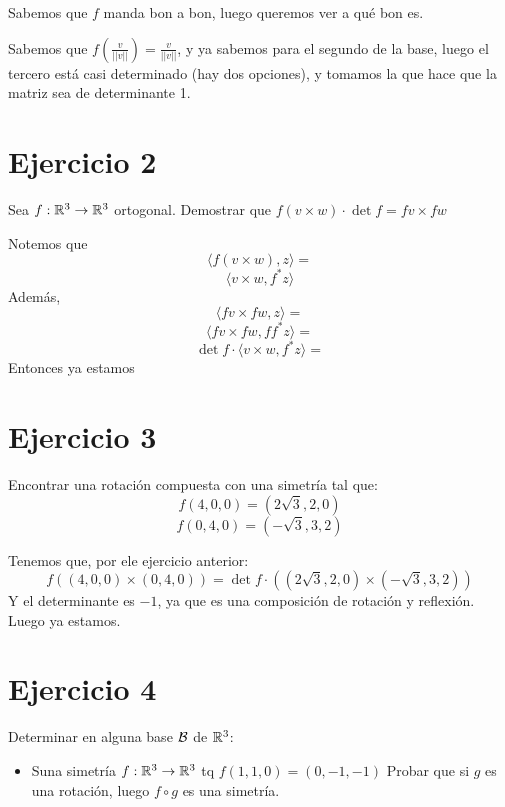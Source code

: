 \documentclass{article}
\begin{document}
Sabemos que $f$ manda bon a bon, luego queremos ver a qué bon es.

Sabemos que $f\left(\frac{v}{||v||}\right) = \frac{v}{||v||}$, y ya sabemos para el segundo de la base, luego el tercero está casi determinado (hay dos opciones), y tomamos la que hace que la matriz sea de determinante 1.

\section*{Ejercicio 2}
Sea $f : \mathbb{R}^3 \to \mathbb{R}^3$ ortogonal. Demostrar que $f(v \times w) \cdot \det f = fv \times fw$

Notemos que
\[
    \langle f(v \times w), z\rangle =
\]
\[
    \langle v \times w, f^*z\rangle
\]
Además,
\[
    \langle fv \times fw, z\rangle =
\]
\[
    \langle fv \times fw, ff^*z\rangle =
\]
\[
    \det f \cdot \langle v \times w, f^*z\rangle =
\]
Entonces ya estamos
\section*{Ejercicio 3}
Encontrar una rotación compuesta con una simetría tal que:
\[f(4,0,0) = (2\sqrt{3}, 2, 0)\]
\[f(0,4,0) = (-\sqrt{3}, 3, 2)\]

Tenemos que, por ele ejercicio anterior:
\[
    f((4,0,0) \times (0,4,0)) = \det f \cdot ((2\sqrt{3}, 2, 0) \times (-\sqrt{3}, 3, 2))
\]
Y el determinante es $-1$, ya que es una composición de rotación y reflexión. Luego ya estamos.
\section*{Ejercicio 4}
Determinar en alguna base $\mathcal{B}$ de $\mathbb{R}^3$:
\begin{itemize}
    \item Suna simetría $f : \mathbb{R}^3 \to \mathbb{R}^3$ tq $f(1,1,0) = (0,-1,-1)$ Probar que si $g$ es una rotación, luego $f \circ g$ es una simetría.
\end{itemize}
\end{document}
